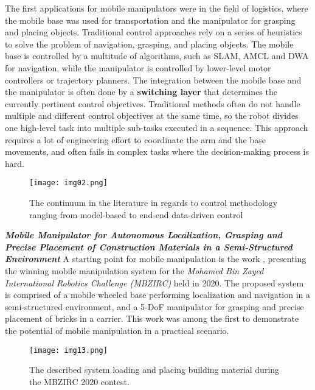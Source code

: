The first applications for mobile manipulators were in the field of logistics, where the
mobile base was used for transportation and the manipulator for grasping and placing objects.
Traditional control approaches rely on a series of heuristics to solve the problem of
navigation, grasping, and placing objects. The mobile base is controlled by a multitude of
algorithms, such as SLAM, AMCL and DWA for navigation, while the manipulator is controlled
by lower-level motor controllers or trajectory planners. The integration between the
mobile base and the manipulator is often done by a \textbf{switching layer} that determines the
currently pertinent control objectives. Traditional methods often do not handle multiple and different
control objectives at the same time, so the robot divides one high-level task
into multiple sub-tasks executed in a sequence.
This approach requires a lot of engineering effort to coordinate the arm and the base
movements, and often fails in complex tasks where the decision-making process is hard.

\begin{figure}[t]
	\centering
	\texttt{[image: img02.png]}
	\captionsetup{width=0.6\linewidth}
	\caption{The continuum in the literature in regards to control
		methodology ranging from model-based to end-end data-driven
		control \cite{thakar2023survey}}
	\label{fig:img02}
\end{figure}


\textbf{\textit{Mobile Manipulator for Autonomous Localization,
		Grasping and Precise Placement of Construction
		Materials in a Semi-Structured Environment}} \quad
A starting point for mobile manipulation is the work \cite{loianno2021construction},
presenting the winning mobile manipulation system for the \textit{Mohamed
	Bin Zayed International Robotics Challenge (MBZIRC)} held in 2020. The proposed system
is comprised of a mobile wheeled base performing localization and navigation in a
semi-structured environment, and a 5-DoF manipulator for grasping and precise placement
of bricks in a carrier. This work was among the first to demonstrate the potential
of mobile manipulation in a practical scenario.

\begin{figure}[t]
	\centering
	\texttt{[image: img13.png]}
	\captionsetup{width=1\linewidth}
	\caption{The described system loading and placing building material
		during the MBZIRC 2020 contest.	\cite{loianno2021construction}}
	\label{fig:img13}
\end{figure}

